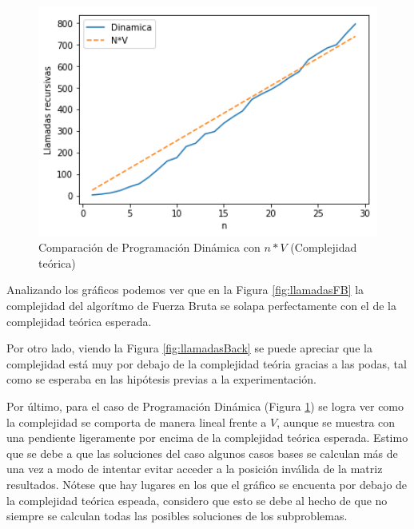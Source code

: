 \begin{figure}[H] 
    \centering
    \begin{minipage}{0.45\textwidth}
        \centering
        \includegraphics[width=1\textwidth]{img/complejidad/llamadasDin.png} %
        \caption{Comparaci\'on de Programaci\'on Din\'amica con $n*V$ (Complejidad te\'orica)}
        \label{fig:llamadasDin}
    \end{minipage}\hfill
\end{figure}

\par Analizando los gr\'aficos podemos ver que en la Figura \ref{fig:llamadasFB} la complejidad del algor\'itmo de Fuerza
Bruta se solapa perfectamente con el de la complejidad te\'orica esperada.
\par Por otro lado, viendo la Figura \ref{fig:llamadasBack} se puede apreciar que la complejidad est\'a muy por debajo
de la complejidad te\'oria gracias a las podas, tal como se esperaba en las hip\'otesis previas a la experimentaci\'on.
\par Por \'ultimo, para el caso de Programaci\'on Din\'amica (Figura \ref{fig:llamadasDin}) se logra ver como la 
complejidad se comporta de manera lineal frente a $V$, aunque se muestra con una pendiente ligeramente
por encima de la complejidad te\'orica esperada. Estimo que se debe a que las soluciones del caso algunos casos bases
se calculan m\'as de una vez a modo de intentar evitar acceder a la posici\'on inv\'alida de la matriz resultados.
N\'otese que hay lugares en los que el gr\'afico se encuenta por debajo de la complejidad te\'orica espeada,
considero que esto se debe al hecho de que no siempre se calculan todas las posibles soluciones de los subproblemas.


